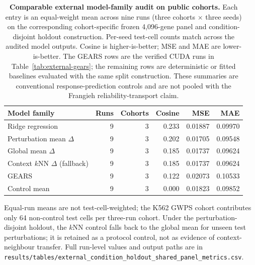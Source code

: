 \begin{table}[H]
\centering
\small
\setlength{\tabcolsep}{3.5pt}
\caption{\textbf{Comparable external model-family audit on public cohorts.}
Each entry is an equal-weight mean across nine runs (three cohorts $\times$
three seeds) on the corresponding cohort-specific frozen 4,096-gene panel and
condition-disjoint
holdout construction. Per-seed test-cell counts match across the audited
model outputs. Cosine is higher-is-better; MSE and MAE are lower-is-better.
The GEARS rows are the verified CUDA runs in Table~\ref{tab:external-gears};
the remaining rows are deterministic or fitted baselines evaluated with the
same split construction. These summaries are conventional response-prediction
controls and are not pooled with the Frangieh reliability-transport claim.}
\label{tab:external-model-summary}
\begin{tabular}{@{}lrrrrr@{}}
\toprule
Model family & Runs & Cohorts & Cosine & MSE & MAE \\
\midrule
Ridge regression & 9 & 3 & 0.233 & 0.01887 & 0.09970 \\
Perturbation mean $\Delta$ & 9 & 3 & 0.202 & 0.01705 & 0.09548 \\
Global mean $\Delta$ & 9 & 3 & 0.185 & 0.01737 & 0.09624 \\
Context $k$NN $\Delta$ (fallback) & 9 & 3 & 0.185 & 0.01737 & 0.09624 \\
GEARS & 9 & 3 & 0.122 & 0.02073 & 0.10533 \\
Control mean & 9 & 3 & 0.000 & 0.01823 & 0.09852 \\
\bottomrule
\end{tabular}
\par\noindent
\raggedright\footnotesize Equal-run means are not test-cell-weighted; the K562
GWPS cohort contributes only 64 non-control test cells per three-run cohort.
Under the perturbation-disjoint holdout, the $k$NN control falls back to the
global mean for unseen test perturbations; it is retained as a protocol
control, not as evidence of context-neighbour transfer. Full run-level values
and output paths are in
\texttt{results/tables/external\_condition\_holdout\_shared\_panel\_metrics.csv}.
\end{table}
